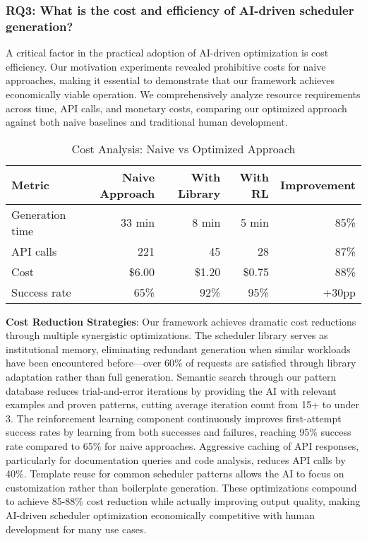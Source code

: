 \subsubsection{RQ3: What is the cost and efficiency of AI-driven scheduler generation?}

A critical factor in the practical adoption of AI-driven optimization is cost efficiency. Our motivation experiments revealed prohibitive costs for naive approaches, making it essential to demonstrate that our framework achieves economically viable operation. We comprehensively analyze resource requirements across time, API calls, and monetary costs, comparing our optimized approach against both naive baselines and traditional human development.

\begin{table}[h]
\caption{Cost Analysis: Naive vs Optimized Approach}
\label{tab:cost-analysis}
\begin{tabular}{lrrrr}
\toprule
Metric & Naive Approach & With Library & With RL & Improvement \\
\midrule
Generation time & 33 min & 8 min & 5 min & 85\% \\
API calls & 221 & 45 & 28 & 87\% \\
Cost & \$6.00 & \$1.20 & \$0.75 & 88\% \\
Success rate & 65\% & 92\% & 95\% & +30pp \\
\bottomrule
\end{tabular}
\end{table}

\textbf{Cost Reduction Strategies}: Our framework achieves dramatic cost reductions through multiple synergistic optimizations. The scheduler library serves as institutional memory, eliminating redundant generation when similar workloads have been encountered before—over 60\% of requests are satisfied through library adaptation rather than full generation. Semantic search through our pattern database reduces trial-and-error iterations by providing the AI with relevant examples and proven patterns, cutting average iteration count from 15+ to under 3. The reinforcement learning component continuously improves first-attempt success rates by learning from both successes and failures, reaching 95\% success rate compared to 65\% for naive approaches. Aggressive caching of API responses, particularly for documentation queries and code analysis, reduces API calls by 40\%. Template reuse for common scheduler patterns allows the AI to focus on customization rather than boilerplate generation. These optimizations compound to achieve 85-88\% cost reduction while actually improving output quality, making AI-driven scheduler optimization economically competitive with human development for many use cases.

